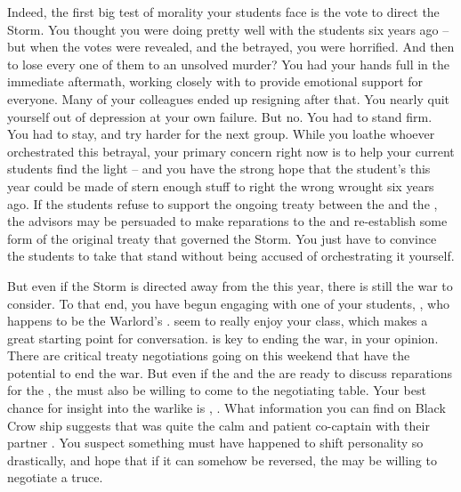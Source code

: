 \documentclass[char]{GL2020}
\begin{document}
Indeed, the first big test of morality your students face is the vote to direct the Storm. You thought you were doing pretty well with the students six years ago -- but when the votes were revealed, and the \pShip{} betrayed, you were horrified. And then to lose every one of them to an unsolved murder? You had your hands full in the immediate aftermath, working closely with \cFlowPriest{\full} to provide emotional support for everyone. Many of your colleagues ended up resigning after that. You nearly quit yourself out of depression at your own failure. But no. You had to stand firm. You had to stay, and try harder for the next group. While you loathe whoever orchestrated this betrayal, your primary concern right now is to help your current students find the light -- and you have the strong hope that the student's this year could be made of stern enough stuff to right the wrong wrought six years ago. If the students refuse to support the ongoing treaty between the \pFarm{} and the \pTech{}, the advisors may be persuaded to make reparations to the \pShip{} and re-establish some form of the original treaty that governed the Storm. You just have to convince the students to take that stand without being accused of orchestrating it yourself.

But even if the Storm is directed away from the \pShip{} this year, there is still the war to consider. To that end, you have begun engaging with one of your \pShip{} students, \cWarlordDaughter{\full}, who happens to be the Warlord's \cWarlordDaughter{\child}. \cWarlordDaughter{\They} seem\cWarlordDaughter{\plural} to really enjoy your class, which makes a great starting point for conversation. \cWarlordDaughter{} is key to ending the war, in your opinion. There are critical treaty negotiations going on this weekend that have the potential to end the war. But even if the \pFarm{} and the \pTech{} are ready to discuss reparations for the \pShippies{}, the \pShip{} must also be willing to come to the negotiating table. Your best chance for insight into the warlike \cLoud{\full} is \cLoud{\their} \cWarlordDaughter{\child}, \cWarlordDaughter{}. What information you can find on Black Crow ship suggests that \cLoud{} was quite the calm and patient co-captain with their partner \cQuiet{\full}. You suspect something must have happened to shift \cLoud{\their} personality so drastically, and hope that if it can somehow be reversed, the \pShip{} may be willing to negotiate a truce.
\end{document}
